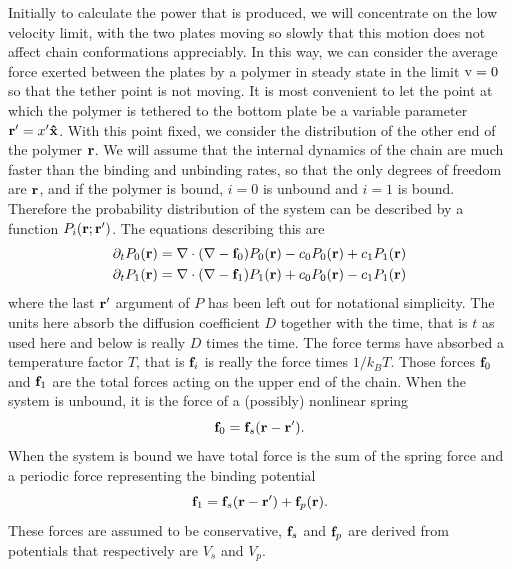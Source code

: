 \documentclass[journal = mamobx, manuscript = article]{achemso}
\def\br{{\bf r}}
\def\bof{{\bf f}}
\def\xhat{{\bf\hat x}}
\begin{document}
Initially to calculate the power that is produced, we will concentrate on the low velocity
limit, with the two plates moving so slowly that this motion does not affect
chain conformations appreciably. In this way, we can consider the average force
exerted between the plates by a polymer in steady state in the limit  ${\rm v}=0$ so that the
tether point is not moving. It is most convenient to let the point at which
the polymer is tethered to the bottom plate be a variable parameter $\br' = x' {\xhat}$.
With this point fixed, we consider the distribution of the other end of the
polymer $\br$.  We will assume that the internal dynamics of the chain
are much faster than the binding and unbinding rates, so that the only degrees
of freedom are $\br$, and if the polymer is bound, $i=0$ is unbound and $i=1$ is bound. Therefore the
probability distribution of the system can be described by a function
$P_i(\br;\br')$. The equations describing this are~\cite{ProstPRL}
\begin{subequations}
\label{eq:FP}
\begin{align}
\partial_t P_0(\br) = \nabla \cdot (\nabla - \bof_0)P_0(\br) - c_0 P_0(\br) + c_1 P_1(\br)\label{eq:FP0}\\
\partial_t P_1(\br) = \nabla \cdot (\nabla - \bof_1)P_1(\br) + c_0 P_0(\br) - c_1 P_1(\br)\label{eq:FP1}
\end{align}
\end{subequations}
where the last $\br'$ argument of $P$ has been left out for notational simplicity.
The units here absorb the diffusion coefficient $D$ together with the time, that
is $t$ as used here and below is really $D$ times the time. The force terms have 
absorbed a temperature factor $T$, that is $\bof_i$ is really the
force times $1/k_B T$.
Those forces $\bof_0$ and $\bof_1$ are the total forces acting on the upper end
of the chain. When the system is unbound, it is the force of a (possibly) nonlinear
spring 
\begin{equation}
\label{eq:unboundF}
\bof_0 = \bof_s(\br-\br'). 
\end{equation}
When the system is bound we have total force
is the sum of the spring force and a periodic force representing the binding
potential 
\begin{equation}
\label{eq:boundF}
\bof_1= \bof_s(\br-\br') + \bof_p(\br).
\end{equation}
These forces are assumed to be conservative, $\bof_s$ and $\bof_p$ are
derived from potentials that respectively are $V_s$ and $V_p$.
\end{document}
